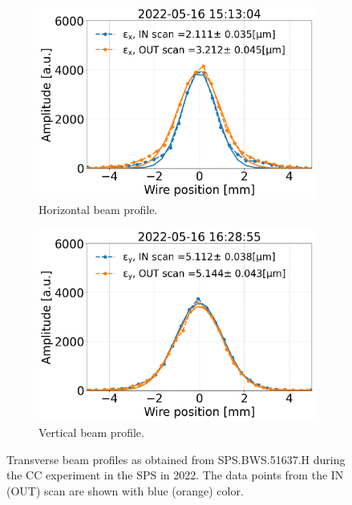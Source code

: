\begin{figure}[htp]
    \centering
    \begin{subfigure}{.45\textwidth}
        \centering
        \includegraphics[width=.95\linewidth]{images/app_c/SPS.BWS.51637.H_IN_OUT_ 15_13_04.png}  
        \caption{Horizontal beam profile.}
        \label{fig:WS_example_profiles_H_2022}
    \end{subfigure}
    \begin{subfigure}{.45\textwidth}
        \centering
        \includegraphics[width=.95\linewidth]{images/app_c/41678.V_IN_OUT_ 16_28_55.png}  
        \caption{Vertical beam profile.}
        \label{fig:WS_example_profiles_V_2022}
    \end{subfigure}
    \caption{Transverse beam profiles as obtained from SPS.BWS.51637.H during the CC experiment in the SPS in 2022. The data points from the IN (OUT) scan are shown with blue (orange) color.}
    \label{fig:WS_example_profiles_H_V_2022}
 \end{figure}
 

